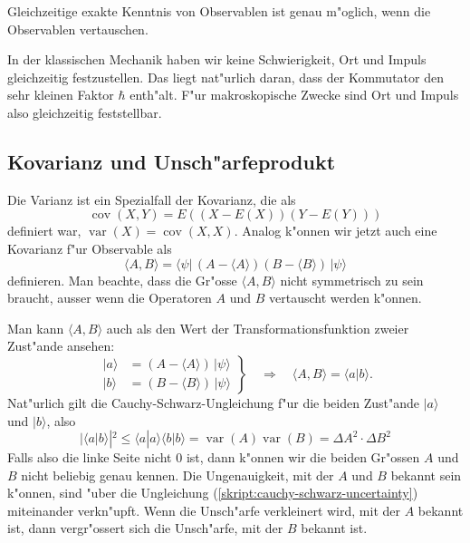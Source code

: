 \begin{satz} Gleichzeitige exakte Kenntnis von Observablen ist genau
m"oglich, wenn die Observablen vertauschen.
\end{satz}

In der klassischen Mechanik haben wir keine Schwierigkeit, Ort und
Impuls gleichzeitig festzustellen. Das liegt nat"urlich daran, dass
der Kommutator den sehr kleinen Faktor $\hbar$ enth"alt.
F"ur makroskopische Zwecke sind Ort und Impuls also gleichzeitig 
feststellbar.


\subsection{Kovarianz und Unsch"arfeprodukt}
Die Varianz ist ein Spezialfall der Kovarianz, die als 
\[
\operatorname{cov}(X,Y)
=
E((X-E(X))(Y-E(Y)))
\]
definiert war, $\operatorname{var}(X)=\operatorname{cov}(X,X)$.
Analog k"onnen wir jetzt auch eine Kovarianz f"ur Observable als
\[
\langle A,B\rangle
=
\langle\psi|
\,
(A-\langle A\rangle)(B-\langle B\rangle)
\,
|\psi\rangle
\]
definieren.
Man beachte, dass die Gr"osse $\langle A,B\rangle$ nicht symmetrisch zu
sein braucht, ausser wenn die Operatoren $A$ und $B$ vertauscht werden
k"onnen.


Man kann $\langle A,B\rangle$ auch als den Wert der Transformationsfunktion 
zweier Zust"ande ansehen:
\begin{equation}
\left.
\begin{aligned}
|a\rangle &= (A-\langle A\rangle)\,|\psi\rangle\\
|b\rangle &= (B-\langle B\rangle)\,|\psi\rangle
\end{aligned}
\right\}
\quad
\Rightarrow
\quad
\langle A,B\rangle = \langle a|b\rangle.
\end{equation}
Nat"urlich gilt die Cauchy-Schwarz-Ungleichung f"ur die beiden
Zust"ande $|a\rangle$ und $|b\rangle$, also
\begin{equation}
|\langle a|b\rangle|^2
\le
\langle a|a\rangle \langle b|b\rangle
=
\operatorname{var}(A)\operatorname{var}(B)
=\Delta A^2 \cdot \Delta B^2
\label{skript:cauchy-schwarz-uncertainty}
\end{equation}
Falls also die linke Seite nicht $0$ ist, dann k"onnen wir die beiden
Gr"ossen $A$ und $B$ nicht beliebig genau kennen.
Die Ungenauigkeit, mit der $A$ und $B$ bekannt sein k"onnen, sind "uber
die Ungleichung (\ref{skript:cauchy-schwarz-uncertainty}) miteinander verkn"upft.
Wenn die Unsch"arfe verkleinert wird, mit der $A$ bekannt ist, dann 
vergr"ossert sich die Unsch"arfe, mit der $B$ bekannt ist.

